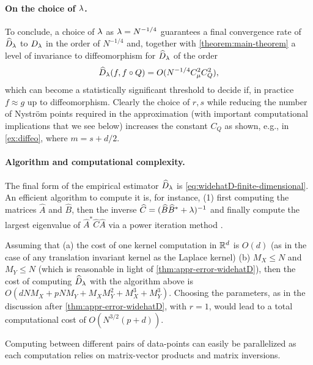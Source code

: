 \paragraph{On the choice of $\lambda$.}
To conclude, a choice of $\lambda$ as $\lambda = N^{-1/4}$ guarantees a final convergence rate of $\widehat{D}_\lambda$ to $D_\lambda$ in the order of $N^{-1/4}$ and, together with \cref{theorem:main-theorem} a level of invariance to diffeomorphism for $\widehat{D}_\lambda$ of the order
$$\widehat{D}_\lambda(f, f \circ Q) = O(N^{-1/4} C_\mu^2 C_Q^2),$$
which can become a statistically significant threshold to decide if, in practice $f \approx g$ up to diffeomorphism.
Clearly the choice of $r,s$ while reducing the number of Nystr\"om points required in the approximation (with important computational implications that we see below) increases the constant $C_Q$ as shown, e.g., in \cref{ex:diffeo}, where $m = s + d/2$.



\paragraph{Algorithm and computational complexity.}
The final form of the empirical estimator $\widehat{D}_\lambda$ is \cref{eq:widehatD-finite-dimensional}. An efficient algorithm to compute it is, for instance, (1) first computing the matrices $\widehat{A}$ and $\widehat{B}$, then the inverse $\widehat{C} = (\widehat{B}\widehat{B}^* + \lambda)^{-1}$ and finally compute the largest eigenvalue of $\widehat{A}^* \widehat{C} \widehat{A}$ via a power iteration method \cite{trefethen1997numerical}. %

Assuming that (a) the cost of one kernel computation in $\mathbb R^d$ is $O(d)$ (as in the case of any translation invariant kernel as the Laplace kernel) (b) $M_X \leq N$ and $M_Y \leq N$ (which is reasonable in light of \cref{thm:appr-error-widehatD}), then the cost of computing $\widehat{D}_\lambda$ with the algorithm above is
$O(d N M_X + p N M_Y + M_XM_Y^2 + M_X^3 + M_Y^3)$.
Choosing the parameters, as in the discussion after \cref{thm:appr-error-widehatD}, with $r = 1$, would lead to a total computational cost of
$O(N^{3/2}(p+d)).$

Computing \Diffy between different pairs of data-points can easily be parallelized as each computation relies on matrix-vector products and matrix inversions.

